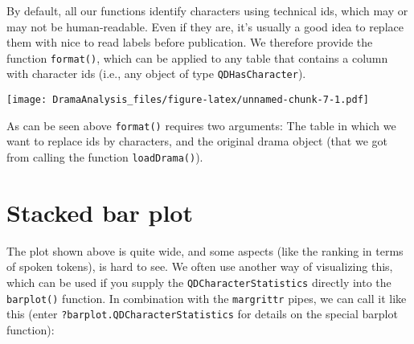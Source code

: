 \documentclass[]{book}
\newenvironment{Shaded}{\begin{snugshade}}{\end{snugshade}}
\newcommand{\CommentTok}[1]{\textcolor[rgb]{0.56,0.35,0.01}{\textit{#1}}}
\newcommand{\DataTypeTok}[1]{\textcolor[rgb]{0.13,0.29,0.53}{#1}}
\newcommand{\DecValTok}[1]{\textcolor[rgb]{0.00,0.00,0.81}{#1}}
\newcommand{\KeywordTok}[1]{\textcolor[rgb]{0.13,0.29,0.53}{\textbf{#1}}}
\newcommand{\NormalTok}[1]{#1}
\newcommand{\OperatorTok}[1]{\textcolor[rgb]{0.81,0.36,0.00}{\textbf{#1}}}
\newcommand{\OtherTok}[1]{\textcolor[rgb]{0.56,0.35,0.01}{#1}}
\newcommand{\StringTok}[1]{\textcolor[rgb]{0.31,0.60,0.02}{#1}}
\begin{document}
By default, all our functions identify characters using technical ids, which may or may not be human-readable. Even if they are, it's usually a good idea to replace them with nice to read labels before publication. We therefore provide the function \texttt{format()}, which can be applied to any table that contains a column with character ids (i.e., any object of type \texttt{QDHasCharacter}).

\begin{Shaded}
\end{Shaded}

\texttt{[image: DramaAnalysis\_files/figure-latex/unnamed-chunk-7-1.pdf]}

As can be seen above \texttt{format()} requires two arguments: The table in which we want to replace ids by characters, and the original drama object (that we got from calling the function \texttt{loadDrama()}).

\hypertarget{stacked-bar-plot}{%
\section{Stacked bar plot}\label{stacked-bar-plot}}

The plot shown above is quite wide, and some aspects (like the ranking in terms of spoken tokens), is hard to see. We often use another way of visualizing this, which can be used if you supply the \texttt{QDCharacterStatistics} directly into the \texttt{barplot()} function. In combination with the \texttt{margrittr} pipes, we can call it like this (enter \texttt{?barplot.QDCharacterStatistics} for details on the special barplot function):
\end{document}
